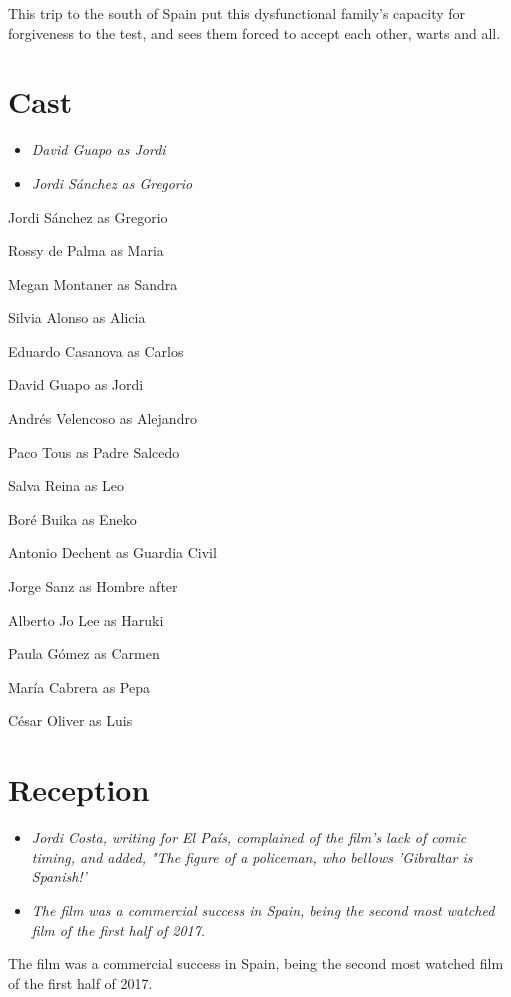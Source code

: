 This trip to the south of Spain put this dysfunctional family's capacity
for forgiveness to the test, and sees them forced to accept each other,
warts and all.

\section{Cast}\label{cast}

\begin{itemize}
\item
  \emph{David Guapo as Jordi}
\item
  \emph{Jordi Sánchez as Gregorio}
\end{itemize}

Jordi Sánchez as Gregorio

Rossy de Palma as Maria

Megan Montaner as Sandra

Silvia Alonso as Alicia

Eduardo Casanova as Carlos

David Guapo as Jordi

Andrés Velencoso as Alejandro

Paco Tous as Padre Salcedo

Salva Reina as Leo

Boré Buika as Eneko

Antonio Dechent as Guardia Civil

Jorge Sanz as Hombre after

Alberto Jo Lee as Haruki

Paula Gómez as Carmen

María Cabrera as Pepa

César Oliver as Luis

\section{Reception}\label{reception}

\begin{itemize}
\item
  \emph{Jordi Costa, writing for El País, complained of the film's lack
  of comic timing, and added, "The figure of a policeman, who bellows
  'Gibraltar is Spanish!'}
\item
  \emph{The film was a commercial success in Spain, being the second
  most watched film of the first half of 2017.}
\end{itemize}

The film was a commercial success in Spain, being the second most
watched film of the first half of 2017.

